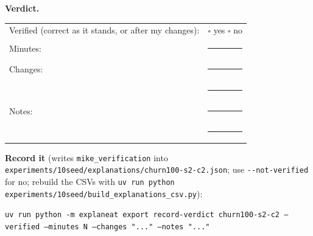 \documentclass[a4paper,11pt]{article}
\begin{document}
\textbf{Verdict.}

\begin{tabularx}{\linewidth}{@{}lX@{}}
Verified (correct as it stands, or after my changes): & $\square$ yes \quad $\square$ no \\[4pt]
Minutes: & \rule{3cm}{0.4pt} \\[4pt]
Changes: & \rule{\linewidth}{0.4pt} \\[10pt]
 & \rule{\linewidth}{0.4pt} \\[4pt]
Notes: & \rule{\linewidth}{0.4pt} \\[10pt]
 & \rule{\linewidth}{0.4pt} \\
\end{tabularx}

\textbf{Record it} (writes \texttt{mike\_verification} into \texttt{experiments/10seed/explanations/churn100-s2-c2.json}; use \texttt{-{}-not-verified} for no; rebuild the CSVs with \texttt{uv run python experiments/10seed/build\_explanations\_csv.py}):

{\footnotesize\raggedright\texttt{uv run python -m explaneat export record-verdict churn100-s2-c2 --verified --minutes N --changes "..." --notes "..."}\par}


\clearpage
























\clearpage
\end{document}

